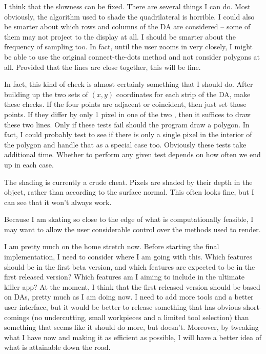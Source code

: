 \documentclass[titlepage,oneside,10pt]{article}
\begin{document}
I think that the slowness can be fixed. There are several things I can
do. Most obviously, the algorithm used to shade the quadrilateral is
horrible. I could also be smarter about which rows and columns of the
DA are considered -- some of them may not project to the display at
all. I should be smarter about the frequency of sampling too. In fact,
until the user zooms in very closely, I might be able to use the
original connect-the-dots method and not consider polygons at
all. Provided that the lines are close together, this will be fine.

In fact, this kind of check is almost certainly something that I
should do. After building up the two sets of $(x,y)$ coordinates for
each strip of the DA, make these checks. If the four points are
adjacent or coincident, then just set those points. If they differ by
only 1 pixel in one of the two , then it suffices to draw these two
lines. Only if these tests fail should the program draw a polygon. In
fact, I could probably test to see if there is only a single pixel in
the interior of the polygon and handle that as a special case
too. Obviously these tests take additional time. Whether to perform
any given test depends on how often we end up in each case.

The shading is currently a crude cheat. Pixels are shaded by their
depth in the object, rather than according to the surface normal. This
often looks fine, but I can see that it won't always work. 

Because I am skating so close to the edge of what is computationally
feasible, I may want to allow the user considerable control over the
methods used to render.

I am pretty much on the home stretch now. Before starting the final
implementation, I need to consider where I am going with this. Which
features should be in the first beta version, and which features are
expected to be in the first released version? Which features am I
aiming to include in the ultimate killer app? At the moment, I think
that the first released version should be based on DAs, pretty much as
I am doing now. I need to add more tools and a better user interface,
but it would be better to release something that has obvious
short-comings (no undercutting, small workpieces and a limited tool
selection) than something that seems like it should do more, but
doesn't. Moreover, by tweaking what I have now and making it as
efficient as possible, I will have a better idea of what is attainable
down the road.
\end{document}
